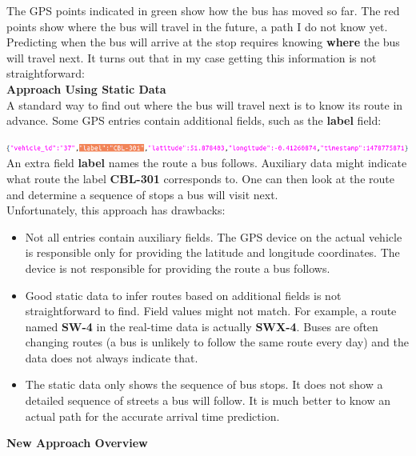 \documentclass[12pt,a4paper,oneside,openright]{report}
\begin{document}
The GPS points indicated in green show how the bus has moved so far.
The red points show where the bus will travel in the future,
a path I do not know yet. Predicting when the bus will arrive at the stop
requires knowing \textbf{where} the bus will travel next. It turns out that
in my case getting this information is not straightforward: \\

\textbf{Approach Using Static Data} \\

A standard way to find out where the bus will travel next is to know its 
route in advance. Some GPS entries contain additional fields,
such as the \textbf{label} field:

\includegraphics[width=\textwidth, scale=1.2]{figs/labelled_entry.png} \\

An extra field \textbf{label} names the route a bus follows. Auxiliary
data might indicate what route the label \textbf{CBL-301} corresponds to.
One can then look at the route and determine a sequence of stops 
a bus will visit next. \\

Unfortunately, this approach has drawbacks:

\begin{itemize}
\item Not all entries contain auxiliary fields. The GPS device on the
actual vehicle is responsible only for providing the latitude and longitude
coordinates. The device is not responsible for providing the route a bus follows.

\item Good static data to infer routes based on additional fields is not 
straightforward to find. Field values might not match. For example, a route
named \textbf{SW-4} in the real-time data is actually \textbf{SWX-4}.
Buses are often changing routes (a bus is unlikely to follow the same route
every day) and the data does not always indicate that.

\item The static data only shows the sequence of bus stops. It does not show a detailed
sequence of streets a bus will follow. It is much better to know an actual
path for the accurate arrival time prediction.
\end{itemize}

\textbf{New Approach Overview} \\
\end{document}
